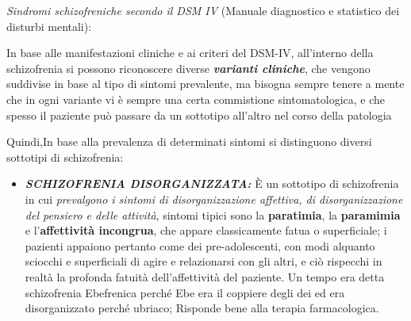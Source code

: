 \emph{Sindromi schizofreniche secondo il DSM IV} (Manuale diagnostico e
statistico dei disturbi mentali):

In base alle manifestazioni cliniche e ai criteri del DSM-IV,
all'interno della schizofrenia si possono riconoscere diverse
\textbf{\emph{varianti cliniche}}, che vengono suddivise in base al tipo
di sintomi prevalente, ma bisogna sempre tenere a mente che in ogni
variante vi è sempre una certa commistione sintomatologica, e che spesso
il paziente può passare da un sottotipo all'altro nel corso della
patologia

Quindi,In base alla prevalenza di determinati sintomi si distinguono
diversi sottotipi di schizofrenia:

\begin{itemize}
\item
  \textbf{\emph{SCHIZOFRENIA DISORGANIZZATA:}} È un sottotipo di
  schizofrenia in cui \emph{prevalgono i sintomi di disorganizzazione
  affettiva, di disorganizzazione del pensiero e delle attività},
  sintomi tipici sono la \textbf{paratimia}, la \textbf{paramimia} e
  l'\textbf{affettività incongrua}, che appare classicamente fatua o
  superficiale; i pazienti appaiono pertanto come dei pre-adolescenti,
  con modi alquanto sciocchi e superficiali di agire e relazionarsi con
  gli altri, e ciò rispecchi in realtà la profonda fatuità
  dell'affettività del paziente. Un tempo era detta schizofrenia
  Ebefrenica perché Ebe era il coppiere degli dei ed era disorganizzato
  perché ubriaco; Risponde bene alla terapia farmacologica.


\end{itemize}
